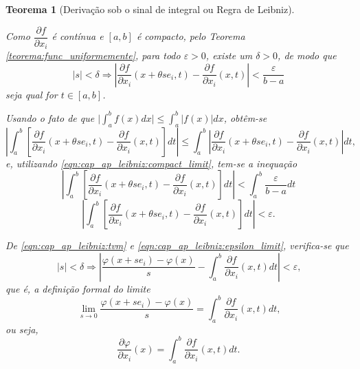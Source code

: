 \documentclass[
	12pt,				%
	openright,			%
    twoside,			%
	a4paper,			%
	english,			%
	french,				%
	spanish,			%
	brazil				%
	]{abntex2}
\makeatletter
\newtheorem{teorema}{Teorema}
\renewenvironment{proof}[1][\proofname]{
	\par\pushQED{\qed}%
	\normalfont \topsep6\p@\@plus6\p@\relax
	\trivlist
	\item\relax
		{\itshape
			#1\@addpunct{.}}\hspace\labelsep\ignorespaces
}{%
	\popQED\endtrivlist\@endpefalse
}
\numberwithin{lema}{chapter}
\numberwithin{teorema}{chapter}
\numberwithin{definicao}{chapter}
\numberwithin{exemplo}{chapter}
\numberwithin{figure}{chapter}
\makeatother
\begin{document}
\begin{apendicesenv}
{\begin{teorema}[Derivação sob o sinal de integral ou Regra de Leibniz]
\begin{proof}
			Como $\dfrac{\partial f}{\partial x_i}$ é contínua e $[a,b]$ é compacto, pelo Teorema \ref{teorema:func_uniformemente}, para todo $\varepsilon > 0$, existe um $\delta > 0$, de modo que
			\begin{equation}
				\label{eqn:cap_ap_leibniz:compact_limit}
				|s|<\delta \Longrightarrow
				\left | 
					\frac{\partial f}{\partial x_i} (x+\theta s e_i, t) - \frac{\partial f}{\partial x_i}(x,t)
				\right | < \frac{\varepsilon}{b-a}
			\end{equation}
			seja qual for $t \in [a,b]$.
			
			Usando o fato de que $\displaystyle \Big |\int_a^b f(x)dx \Big | \leqslant \int_a^b |f(x)| dx$, obtêm-se
			$$
			\left |
				\int_a^b \left [
					\frac{\partial f}{\partial x_i}(x+\theta s e_i, t)-\frac{\partial f}{\partial x_i}(x,t)
				\right ] dt
			\right |
			\leqslant
			\int_a^b\left |
				\frac{\partial f}{\partial x_i}(x+\theta s e_i, t)-\frac{\partial f}{\partial x_i}(x,t)
			\right | dt\text{,}
			$$
			e, utilizando \eqref{eqn:cap_ap_leibniz:compact_limit}, tem-se a inequação
			$$
			\left |
				\int_a^b \left [
					\frac{\partial f}{\partial x_i}(x+\theta s e_i, t)-\frac{\partial f}{\partial x_i}(x,t)
				\right ] dt
			\right |
			<
			\int_a^b \frac{\varepsilon}{b-a} dt
			$$
			\begin{equation}
				\label{eqn:cap_ap_leibniz:epsilon_limit}
				\left |
					\int_a^b \left [
						\frac{\partial f}{\partial x_i}(x+\theta s e_i, t)-\frac{\partial f}{\partial x_i}(x,t)
					\right ] dt
				\right |
				< \varepsilon \text{.}
			\end{equation}
			
			De \eqref{eqn:cap_ap_leibniz:tvm} e \eqref{eqn:cap_ap_leibniz:epsilon_limit}, verifica-se que
			$$
				|s|<\delta \Longrightarrow
				\left |
					\frac{\varphi(x+se_i)-\varphi(x)}{s}
					- \int_a^b \frac{\partial f}{\partial x_i}(x,t) dt
				\right |
				< \varepsilon\text{,}
			$$
			que é, a definição formal do limite
			$$
				 \lim_{s\to 0} \frac{\varphi (x+se_i)-\varphi(x)}{s}= \int_a^b \frac{\partial f}{\partial x_i} (x, t)dt \text{,}
			$$
			ou seja,
			$$
				\frac{\partial \varphi}{\partial x_i}(x)=\int _a^b \frac{\partial f}{\partial x_i}(x,t)dt\text{.}
			$$
		\end{proof}
	\end{teorema}
	
}
\end{apendicesenv}
\end{document}

